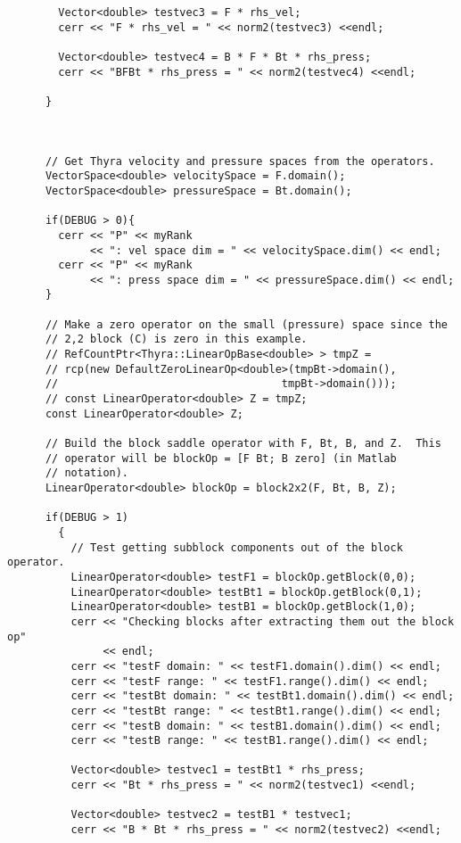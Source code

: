 \begin{verbatim}
        Vector<double> testvec3 = F * rhs_vel;
        cerr << "F * rhs_vel = " << norm2(testvec3) <<endl;

        Vector<double> testvec4 = B * F * Bt * rhs_press;
        cerr << "BFBt * rhs_press = " << norm2(testvec4) <<endl;

      }



      // Get Thyra velocity and pressure spaces from the operators.
      VectorSpace<double> velocitySpace = F.domain();
      VectorSpace<double> pressureSpace = Bt.domain();

      if(DEBUG > 0){
        cerr << "P" << myRank 
             << ": vel space dim = " << velocitySpace.dim() << endl;
        cerr << "P" << myRank 
             << ": press space dim = " << pressureSpace.dim() << endl;
      }

      // Make a zero operator on the small (pressure) space since the
      // 2,2 block (C) is zero in this example.
      // RefCountPtr<Thyra::LinearOpBase<double> > tmpZ = 
      // rcp(new DefaultZeroLinearOp<double>(tmpBt->domain(), 
      //                                   tmpBt->domain()));
      // const LinearOperator<double> Z = tmpZ;
      const LinearOperator<double> Z;

      // Build the block saddle operator with F, Bt, B, and Z.  This
      // operator will be blockOp = [F Bt; B zero] (in Matlab
      // notation).
      LinearOperator<double> blockOp = block2x2(F, Bt, B, Z);

      if(DEBUG > 1) 
        {
          // Test getting subblock components out of the block operator.
          LinearOperator<double> testF1 = blockOp.getBlock(0,0);
          LinearOperator<double> testBt1 = blockOp.getBlock(0,1);
          LinearOperator<double> testB1 = blockOp.getBlock(1,0);
          cerr << "Checking blocks after extracting them out the block op"
               << endl;
          cerr << "testF domain: " << testF1.domain().dim() << endl;
          cerr << "testF range: " << testF1.range().dim() << endl;
          cerr << "testBt domain: " << testBt1.domain().dim() << endl;
          cerr << "testBt range: " << testBt1.range().dim() << endl;
          cerr << "testB domain: " << testB1.domain().dim() << endl;
          cerr << "testB range: " << testB1.range().dim() << endl;

          Vector<double> testvec1 = testBt1 * rhs_press;
          cerr << "Bt * rhs_press = " << norm2(testvec1) <<endl;
	  
          Vector<double> testvec2 = testB1 * testvec1;
          cerr << "B * Bt * rhs_press = " << norm2(testvec2) <<endl;
	  

\end{verbatim}

